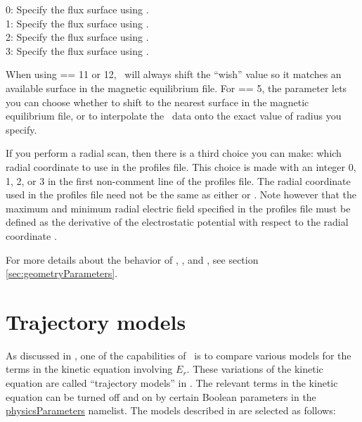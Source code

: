 {\setlength{\parindent}{0cm}

0: Specify the flux surface using .\\

1: Specify the flux surface using .\\

2: Specify the flux surface using .\\

3: Specify the flux surface using .\\

}

When using  == 11 or 12, \sfincs~will always shift the ``wish'' value so it matches an available surface in the magnetic equilibrium file.
For  == 5, the  parameter lets you can choose whether to shift to the nearest surface in the magnetic equilibrium file,
or to interpolate the \vmec~data onto the exact value of radius you specify.

If you perform a radial scan, then there is a third choice you can make: which radial coordinate to use in the {\ttfamily profiles} file.
This choice is made with an integer 0, 1, 2, or 3 in the first non-comment line of the {\ttfamily profiles} file.
The radial coordinate used in the {\ttfamily profiles} file need not be the same as either
 or .
Note however that the maximum and minimum radial electric field specified in the {\ttfamily profiles}
file must be defined as the derivative of the electrostatic potential with respect to the radial coordinate .

For more details about the behavior of , , and ,
see section \ref{sec:geometryParameters}.

\section{Trajectory models}
\label{sec:trajectoryModels}

As discussed in \cite{sfincsPaper},
one of the capabilities of \sfincs~is to compare various models for the terms in the kinetic equation involving $E_r$.
These variations of the kinetic equation are called ``trajectory models'' in \cite{sfincsPaper}.
The relevant terms in the kinetic equation can be turned off and on by certain Boolean parameters in the {\ttfamily \hyperref[sec:physicsParameters]{physicsParameters}} namelist.
The models described in \cite{sfincsPaper} are selected as follows:\\

